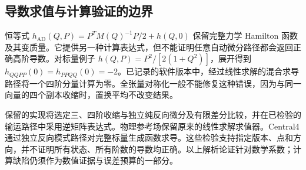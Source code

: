 \subsection{导数求值与计算验证的边界}
恒等式 $h_{\mathrm{AD}}(Q,P)=P^TM(Q)^{-1}P/2+h(Q,0)$ 保留完整力学 Hamilton 函数及其变质量。它提供另一种计算表达式，但不能证明任意自动微分路径都会返回正确高阶导数。对标量例子 $h(Q,P)=P^2/[2(1+Q^2)]$，展开得到 $h_{QQPP}(0)=h_{PPQQ}(0)=-2$。已记录的软件版本中，经过线性求解的混合求导路径将一个四阶分量计算为零。全张量对称化一般不能修复这种错误，因为与同一向量的四个副本收缩时，置换平均不改变结果。

保留的实现将选定三、四阶收缩与独立纯反向微分及有限差分比较，并在已检验的输运路径中采用逆矩阵表达式。物理参考场保留原来的线性求解求值器。Central4 通过独立反向模式路径对完整标量生成函数求导。这些检验支持指定版本、点和方向，并不证明所有状态、所有阶数的导数均正确。以上解析论证针对数学系数；计算缺陷仍须作为数值证据与误差预算的一部分。
